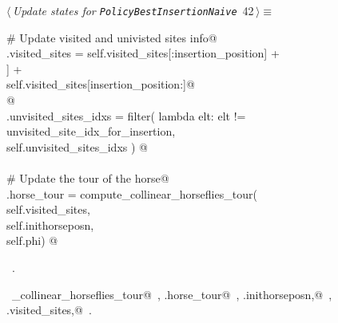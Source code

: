 \documentclass[11.5pt]{report}
\begin{document}
\vspace{-0.8cm}\newchunk 

\begin{flushleft} \small\label{scrap60}\raggedright\small
{} $\langle\,${\itshape Update states for \texttt{PolicyBestInsertionNaive}}\nobreak\ {\footnotesize {42}}$\,\rangle\equiv$
\vspace{-1ex}
\begin{list}{}{} \item
\mbox{}\verb@# Update visited and univisted sites info@\\
\mbox{}\verb@self.visited_sites = self.visited_sites[:insertion_position]      +\@\\
\mbox{}\verb@                     [self.sites[unvisited_site_idx_for_insertion]] +\@\\
\mbox{}\verb@                     self.visited_sites[insertion_position:]@\\
\mbox{}\verb@  @\\
\mbox{}\verb@self.unvisited_sites_idxs = filter( lambda elt: elt != unvisited_site_idx_for_insertion, \@\\
\mbox{}\verb@                                    self.unvisited_sites_idxs ) @\\
\mbox{}\verb@@\\
\mbox{}\verb@# Update the tour of the horse@\\
\mbox{}\verb@self.horse_tour = compute_collinear_horseflies_tour(\@\\
\mbox{}\verb@                           self.visited_sites,         \@\\
\mbox{}\verb@                           self.inithorseposn, \@\\
\mbox{}\verb@                           self.phi) @\\
\mbox{}\verb@@{\NWsep}
\end{list}
\vspace{-1.5ex}
\footnotesize
\begin{list}{}{\setlength{\itemsep}{-\parsep}\setlength{\itemindent}{-\leftmargin}}
\item \NWtxtMacroRefIn\ .
\item \NWtxtIdentsUsed\nobreak\  \verb@compute_collinear_horseflies_tour@\nobreak\ , \verb@self.horse_tour@\nobreak\ , \verb@self.inithorseposn,@\nobreak\ , \verb@self.visited_sites,@\nobreak\ .
\item{}
\end{list}
\vspace{4ex}
\end{flushleft}
\newpage
\end{document}
